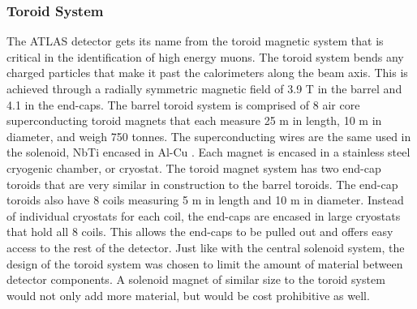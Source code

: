 	\subsubsection{Toroid System}\label{sssec:toroid}
	The ATLAS detector gets its name from the toroid magnetic system that is critical in the identification of high energy muons. The toroid system bends any charged particles that make it past the calorimeters along the beam axis. This is achieved through a radially symmetric magnetic field of 3.9 T in the barrel and 4.1 in the end-caps. The barrel toroid system is comprised of 8 air core superconducting toroid magnets that each measure 25 m in length, 10 m in diameter, and weigh 750 tonnes. The superconducting wires are the same used in the solenoid, NbTi encased in Al-Cu \cite{atlas-toroid}. Each magnet is encased in a stainless steel cryogenic chamber, or cryostat. The toroid magnet system has two end-cap toroids that are very similar in construction to the barrel toroids. The end-cap toroids also have 8 coils measuring 5 m in length and 10 m in diameter. Instead of individual cryostats for each coil, the end-caps are encased in large cryostats that hold all 8 coils. This allows the end-caps to be pulled out and offers easy access to the rest of the detector. Just like with the central solenoid system, the design of the toroid system was chosen to limit the amount of material between detector components. A solenoid magnet of similar size to the toroid system would not only add more material, but would be cost prohibitive as well.


